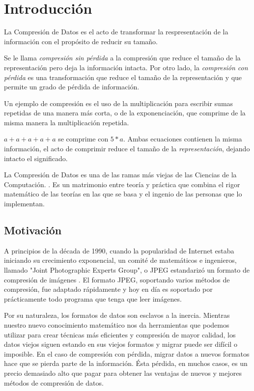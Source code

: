 \chapter{Introducción}\label{ch:introduction}

La \gls{Compresión de Datos} es el acto de transformar la respresentación de la
información con el propósito de reducir su tamaño.

Se le llama \emph{\gls{compresión sin pérdida}} a la compresión que reduce el tamaño
de la representación pero deja la información intacta. Por otro lado, la
\emph{\gls{compresión con pérdida}} es una transformación que reduce el tamaño de la
representación y que permite un grado de pérdida de información.

Un ejemplo de compresión es el uso de la multiplicación para escribir sumas
repetidas de una manera más corta, o de la exponenciación, que comprime de la
misma manera la multiplicación repetida.

$ a + a + a + a + a $ se comprime con $ 5 * a $. Ambas ecuaciones contienen la
misma información, el acto de comprimir reduce el tamaño de la
\emph{representación}, dejando intacto el significado.

La Compresión de Datos es una de las ramas más viejas de las Ciencias de la
Computación. \cite{cs_the_discipline}. Es un matrimonio entre teoría y práctica
que combina el rigor matemático de las teorías en las que se basa y el ingenio
de las personas que lo implementan.

\section{Motivación}

A principios de la década de 1990, cuando la popularidad de Internet estaba
iniciando su crecimiento exponencial, un comité de matemáticos e ingenieros,
llamado "Joint Photographic Experts Group", o \gls{JPEG} estandarizó un formato de
compresión de imágenes \cite{jpeg-spec}. El formato JPEG, soportando varios
métodos de compresión, fue adaptado rápidamente y hoy en día es soportado por
prácticamente todo programa que tenga que leer imágenes.

Por su naturaleza, los formatos de datos son esclavos a la inercia. Mientras
nuestro nuevo conocimiento matemático nos da herramientas que podemos utilizar
para crear técnicas más eficientes y compresión de mayor calidad, los datos
viejos siguen estando en sus viejos formatos y migrar puede ser difícil o
imposible. En el caso de \gls{compresión con pérdida}, migrar datos a nuevos formatos
hace que se pierda parte de la información. Ésta pérdida, en muchos casos, es
un precio demasiado alto que pagar para obtener las ventajas de nuevos y
mejores métodos de compresión de datos.

